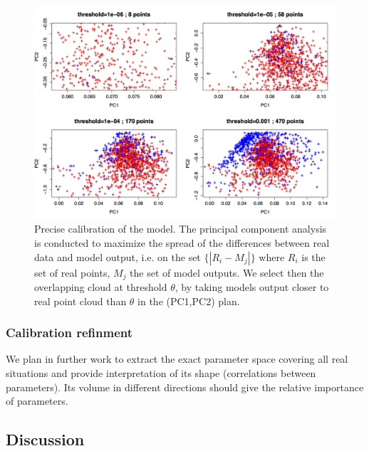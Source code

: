 \begin{figure}
\includegraphics[width=\textwidth]{Figures/PartII/Modeling/UrbanGrowth/pcaDiff_thresholds}
\caption[Precise calibration of the model]{Precise calibration of the model. The principal component analysis is conducted to maximize the spread of the differences between real data and model output, i.e. on the set $\{\left|R_i - M_j\right|\}$ where $R_i$ is the set of real points, $M_j$ the set of model outputs. We select then the overlapping cloud at threshold $\theta$, by taking models output closer to real point cloud than $\theta$ in the (PC1,PC2) plan.}
\label{fig:densitycalib}
\end{figure}



\subsubsection{Calibration refinment}

We plan in further work to extract the exact parameter space covering all real situations and provide interpretation of its shape (correlations between parameters). Its volume in different directions should give the relative importance of parameters.





\subsection{Discussion}


